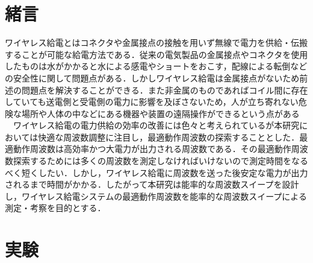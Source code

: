 \documentclass[10pt,a4paper,twocolumn]{jarticle}
\begin{document}


\section{緒言}
ワイヤレス給電とはコネクタや金属接点の接触を用いず無線で電力を供給・伝搬することが可能な給電方法である．従来の電気製品の金属接点やコネクタを使用したものは水がかかると水による感電やショートをおこす，配線による転倒などの安全性に関して問題点がある．しかしワイヤレス給電は金属接点がないため前述の問題点を解決することができる．また非金属のものであればコイル間に存在していても送電側と受電側の電力に影響を及ぼさないため，人が立ち寄れない危険な場所や人体の中などにある機器や装置の遠隔操作ができるという点がある
\\　ワイヤレス給電の電力供給の効率の改善には色々と考えられているが本研究においては快適な周波数調整に注目し，最適動作周波数の探索することとした．最適動作周波数は高効率かつ大電力が出力される周波数である．その最適動作周波数探索するためには多くの周波数を測定しなければいけないので測定時間をなるべく短くしたい．しかし，ワイヤレス給電に周波数を送った後安定な電力が出力されるまで時間がかかる．したがって本研究は能率的な周波数スイープを設計し，ワイヤレス給電システムの最適動作周波数を能率的な周波数スイープによる測定・考察を目的とする．
\section{実験}
\end{document}
